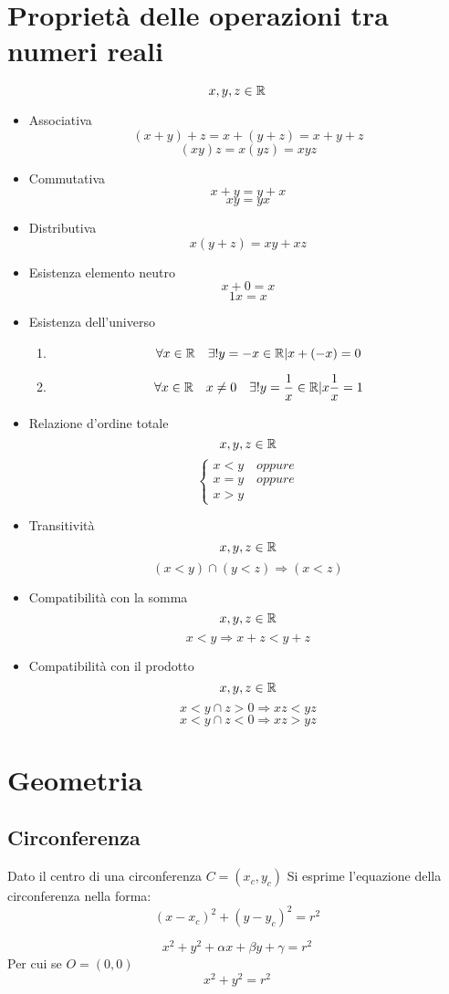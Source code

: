\section{Proprietà delle operazioni tra numeri reali}
\[x,y,z \in \mathbb{R}\]
\begin{itemize}
  \item Associativa
    \[(x+y)+z=x+(y+z)=x+y+z \]
    \[(xy)z=x(yz)=xyz \]
  \item Commutativa
    \[x+y=y+x\]
    \[xy=yx\]
  \item Distributiva
    \[x(y+z)=xy+xz\]
  \item Esistenza elemento neutro
    \[x+0=x\]
    \[1x=x\]
  \item Esistenza dell'universo
    \begin{enumerate}
      \item \[\forall x \in \mathbb{R} \quad \exists !y=-x \in \mathbb{R} | x+(-x)=0\]
      \item \[\forall x \in \mathbb{R} \quad x \neq 0 \quad \exists !y=\frac{1}{x} \in \mathbb{R} | x\frac{1}{x}=1 \]
    \end{enumerate}
  \item Relazione d'ordine totale
    \[x,y,z \in \mathbb{R}\]
    \[
    \begin{cases}
      x<y \quad oppure\\
      x=y \quad oppure\\
      x>y
    \end{cases}
    \]
  \item Transitività
    \[x,y,z \in \mathbb{R}\]
    \[(x<y) \cap (y<z) \Rightarrow (x<z)\]
  \item Compatibilità con la somma
    \[x,y,z \in \mathbb{R}\]
    \[x<y \Rightarrow x+z<y+z\]
  \item Compatibilità con il prodotto
    \[x,y,z \in \mathbb{R}\]
    \[x<y \cap z>0 \Rightarrow xz<yz\]
    \[x<y \cap z<0 \Rightarrow xz>yz\]
\end{itemize}

\section{Geometria}
\subsection{Circonferenza}
Dato il centro di una circonferenza $C=(x_c,y_c)$
Si esprime l'equazione della circonferenza nella forma:
\[(x-x_c)^2+(y-y_c)^2=r^2\]

\[x^2+y^2+\alpha x+ \beta y +\gamma =r^2\]
Per cui se $O=(0,0)$
\[x^2+y^2=r^2\]



